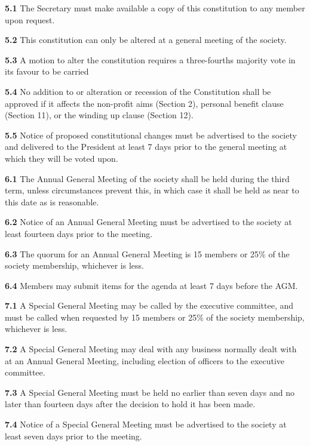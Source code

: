 \textbf{5.1} The Secretary must make available a copy of this constitution to any member upon request.

\textbf{5.2} This constitution can only be altered at a general meeting of the society.

\textbf{5.3} A motion to alter the constitution requires a three-fourths majority vote in its favour to be carried

\textbf{5.4} No addition to or alteration or recession of the Constitution shall be approved if it affects the non-profit aims (Section 2), personal benefit clause (Section 11), or the winding up clause (Section 12).

\textbf{5.5} Notice of proposed constitutional changes must be advertised to the society and delivered to the President at least 7 days prior to the general meeting at which they will be voted upon.

\vspace{1em}

\textbf{6.1} The Annual General Meeting of the society shall be held during the third term, unless circumstances prevent this, in which case it shall be held as near to this date as is reasonable.

\textbf{6.2} Notice of an Annual General Meeting must be advertised to the society at least fourteen days prior to the meeting.

\textbf{6.3} The quorum for an Annual General Meeting is 15 members or 25\% of the society membership, whichever is less.

\textbf{6.4} Members may submit items for the agenda at least 7 days before the AGM. 

\vspace{1em}

\textbf{7.1} A Special General Meeting may be called by the executive committee, and must be called when requested by 15 members or 25\% of the society membership, whichever is less.

\textbf{7.2} A Special General Meeting may deal with any business normally dealt with at an Annual General Meeting, including election of officers to the executive committee.

\textbf{7.3} A Special General Meeting must be held no earlier than seven days and no later than fourteen days after the decision to hold it has been made. 

\textbf{7.4} Notice of a Special General Meeting must be advertised to the society at least seven days prior to the meeting.

